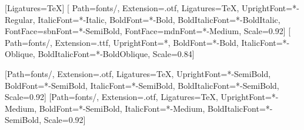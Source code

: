 \usepackage{fontspec}
\usepackage{unicode-math}

\setmainfont{TeX Gyre Pagella}[Ligatures=TeX]
\setsansfont{Inter}[
  Path=fonts/, Extension=.otf, Ligatures=TeX,
  UprightFont=*-Regular, ItalicFont=*-Italic,
  BoldFont=*-Bold, BoldItalicFont=*-BoldItalic,
  FontFace={sb}{n}{Font=*-SemiBold},
  FontFace={md}{n}{Font=*-Medium},
  Scale=0.92]
\setmonofont{DejaVuSansMono}[
  Path=fonts/, Extension=.ttf,
  UprightFont=*, BoldFont=*-Bold, ItalicFont=*-Oblique, BoldItalicFont=*-BoldOblique,
  Scale=0.84]

\newfontfamily{}[Path=fonts/, Extension=.otf, Ligatures=TeX, UprightFont=*-SemiBold, BoldFont=*-SemiBold, ItalicFont=*-SemiBold, BoldItalicFont=*-SemiBold, Scale=0.92]
\newfontfamily{}[Path=fonts/, Extension=.otf, Ligatures=TeX, UprightFont=*-Medium, BoldFont=*-SemiBold, ItalicFont=*-Medium, BoldItalicFont=*-SemiBold, Scale=0.92]
